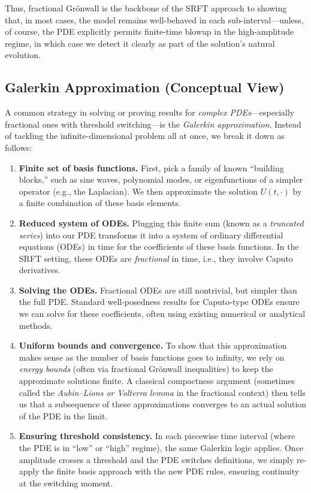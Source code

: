 \documentclass[12pt]{article}
\begin{document}
Thus, fractional Grönwall is the backbone of the SRFT approach to showing that,
in most cases, the model remains well-behaved in each sub-interval—unless, of
course, the PDE explicitly permits finite-time blowup in the high-amplitude regime,
in which case we detect it clearly as part of the solution’s natural evolution.
\subsection{Galerkin Approximation (Conceptual View)}
\label{subsec:galerkin_approx}

A common strategy in solving or proving results for \emph{complex PDEs}—especially
fractional ones with threshold switching—is the \emph{Galerkin approximation}.
Instead of tackling the infinite-dimensional problem all at once, we break it down
as follows:

\begin{enumerate}
    \item \textbf{Finite set of basis functions.} 
    First, pick a family of known “building blocks,” such as sine waves, polynomial
    modes, or eigenfunctions of a simpler operator (e.g., the Laplacian). We then
    approximate the solution $U(t, \cdot)$ by a finite combination of these basis
    elements.

    \item \textbf{Reduced system of ODEs.}
    Plugging this finite sum (known as a \emph{truncated series}) into our PDE
    transforms it into a system of ordinary differential equations (ODEs) in time
    for the coefficients of these basis functions. In the SRFT setting, these ODEs
    are \emph{fractional} in time, i.e., they involve Caputo derivatives.

    \item \textbf{Solving the ODEs.}
    Fractional ODEs are still nontrivial, but simpler than the full PDE. Standard
    well-posedness results for Caputo-type ODEs ensure we can solve for these
    coefficients, often using existing numerical or analytical methods.

    \item \textbf{Uniform bounds and convergence.}
    To show that this approximation makes sense as the number of basis functions
    goes to infinity, we rely on \emph{energy bounds} (often via fractional Grönwall
    inequalities) to keep the approximate solutions finite. A classical compactness
    argument (sometimes called the \emph{Aubin--Lions or Volterra lemma} in the
    fractional context) then tells us that a subsequence of these approximations
    converges to an actual solution of the PDE in the limit.

    \item \textbf{Ensuring threshold consistency.}
    In each piecewise time interval (where the PDE is in “low” or “high” regime),
    the same Galerkin logic applies. Once amplitude crosses a threshold and the PDE
    switches definitions, we simply re-apply the finite basis approach with the new
    PDE rules, ensuring continuity at the switching moment.
\end{enumerate}
\end{document}

